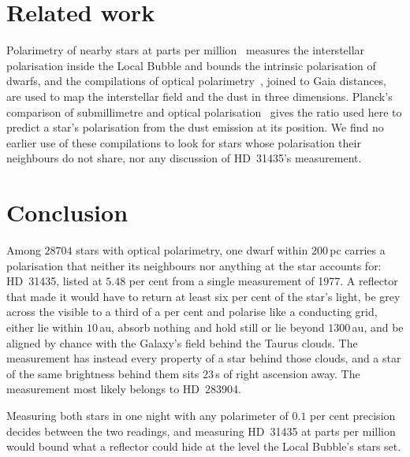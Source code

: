 \documentclass[3p,11pt]{elsarticle}
\begin{document}
\section{Related work}\label{sec:related}

Polarimetry of nearby stars at parts per million~\cite{Cotton2016} measures the
interstellar polarisation inside the Local Bubble and bounds the intrinsic polarisation
of dwarfs, and the compilations of optical
polarimetry~\cite{Heiles2000,Panopoulou2025}, joined to Gaia distances, are used to map
the interstellar field and the dust in three dimensions. Planck's comparison of
submillimetre and optical polarisation~\cite{Planck2015} gives the ratio used here to
predict a star's polarisation from the dust emission at its position. We find no earlier
use of these compilations to look for stars whose polarisation their neighbours do not
share, nor any discussion of HD~31435's measurement.

\section{Conclusion}\label{sec:conclusion}

Among $28704$ stars with optical polarimetry, one dwarf within $200$\,pc carries a
polarisation that neither its neighbours nor anything at the star accounts for: HD~31435,
listed at $5.48$ per cent from a single measurement of 1977. A reflector that made it
would have to return at least six per cent of the star's light, be grey across the
visible to a third of a per cent and polarise like a conducting grid, either lie within
$10$\,au, absorb nothing and hold still or lie beyond $1300$\,au, and be aligned by
chance with the Galaxy's field behind the Taurus clouds. The measurement has instead
every property of a star behind those clouds, and a star of the same brightness behind
them sits $23$\,s of right ascension away. The measurement most likely belongs to
HD~283904.

Measuring both stars in one night with any polarimeter of $0.1$ per cent precision
decides between the two readings, and measuring HD~31435 at parts per million would
bound what a reflector could hide at the level the Local Bubble's stars set.
\end{document}
